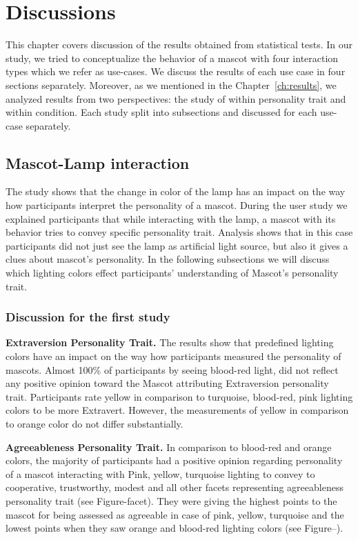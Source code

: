 \chapter{Discussions}
\label{ch:discussions}
This chapter covers discussion of the results obtained from statistical tests.
In our study, we tried to conceptualize the behavior of a mascot with four interaction types which we refer as use-cases.
We discuss the results of each use case in four sections separately.
Moreover, as we mentioned in the Chapter~\ref{ch:results}, we analyzed results from two perspectives: the study of
within personality trait and within condition.
Each study split into subsections and discussed for each use-case separately.

\section{Mascot-Lamp interaction}
\label{sec:mascot-lamp-interaction}
The study shows that the change in color of the lamp has an impact on the way
how participants interpret the personality of a mascot.
During the user study we explained participants that while interacting with the lamp,
a mascot with its behavior tries to convey specific personality trait.
Analysis shows that in this case participants did not just see the lamp as artificial light source,
but also it gives a clues about mascot's personality.
In the following subsections we will discuss which lighting colors effect participants' understanding
of Mascot's personality trait.

\subsection{Discussion for the first study}
\label{subsec:discussion-for-the-first-study}

\par\textbf{Extraversion Personality Trait.}
The results show that predefined lighting colors have an impact on the
way how participants measured the personality of mascots.
Almost 100\% of participants by seeing blood-red light, did not reflect any positive opinion toward the Mascot
attributing Extraversion personality trait.
Participants rate yellow in comparison to turquoise, blood-red, pink lighting colors to be more Extravert.
However, the measurements of yellow in comparison to orange color do not differ substantially.

\par\textbf{Agreeableness Personality Trait.}
In comparison to blood-red and orange colors, the majority of participants had a positive opinion
regarding personality of a mascot interacting with Pink, yellow, turquoise lighting to convey to cooperative,
trustworthy, modest and all other facets representing agreeableness personality trait (see Figure-facet).
They were giving the highest points to the mascot for being assessed as agreeable
in case of pink, yellow, turquoise and the lowest points when they saw orange and blood-red
lighting colors (see Figure--).

